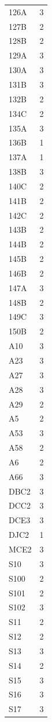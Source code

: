 \begin{longtable}{lr}
  126A & 3 \\
  127B & 2 \\
  128B & 2 \\
  129A & 3 \\
  130A & 3 \\
  131B & 3 \\
  132B & 2 \\
  134C & 2 \\
  135A & 3 \\
  136B & 1 \\
  137A & 1 \\
  138B & 3 \\
  140C & 2 \\
  141B & 2 \\
  142C & 2 \\
  143B & 2 \\
  144B & 2 \\
  145B & 2 \\
  146B & 2 \\
  147A & 3 \\
  148B & 2 \\
  149C & 3 \\
  150B & 2 \\
  A10 & 3 \\
  A23 & 3 \\
  A27 & 3 \\
  A28 & 3 \\
  A29 & 2 \\
  A5 & 2 \\
  A53 & 3 \\
  A58 & 2 \\
  A6 & 2 \\
  A66 & 3 \\
  DBC2 & 3 \\
  DCC2 & 3 \\
  DCE3 & 3 \\
  DJC2 & 1 \\
  MCE2 & 3 \\
  S10 & 3 \\
  S100 & 2 \\
  S101 & 2 \\
  S102 & 3 \\
  S11 & 2 \\
  S12 & 2 \\
  S13 & 3 \\
  S14 & 2 \\
  S15 & 3 \\
  S16 & 3 \\
  S17 & 3 \\

\end{longtable}
